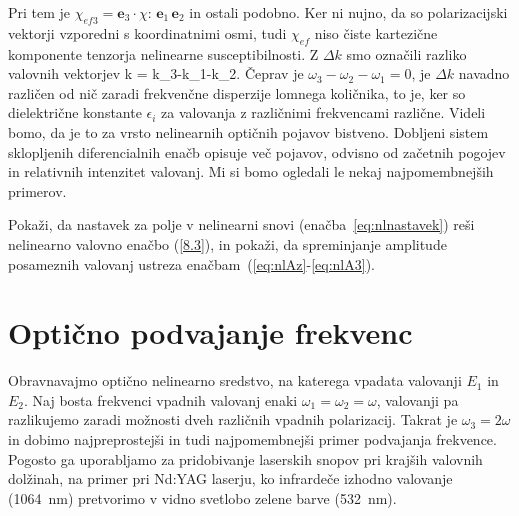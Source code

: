 \documentclass[11pt,fleqn]{book} %
\begin{document}
Pri tem je $\chi_{ef3}=\mathbf{e}_{3}\cdot\chi:\,\mathbf{e}_{1}\,\mathbf{e}_{2}$ in ostali podobno.
Ker ni nujno, da so polarizacijski vektorji vzporedni s koordinatnimi osmi, tudi $\chi_{ef}$ 
niso čiste kartezične komponente tenzorja nelinearne susceptibilnosti. 
Z $\Delta k$ smo označili razliko valovnih vektorjev
\beq
\Delta k = k_{3}-k_{1}-k_{2}.
\eeq
Čeprav je $\omega_{3}-\omega_{2}-\omega_{1}=0$, je $\Delta k$ navadno različen od nič zaradi 
frekvenčne disperzije lomnega količnika, to je, ker so dielektrične konstante $\epsilon_{i}$
za valovanja z različnimi frekvencami različne. Videli bomo, da je to za vrsto nelinearnih optičnih pojavov
bistveno. Dobljeni sistem sklopljenih diferencialnih enačb opisuje več pojavov, 
odvisno od začetnih pogojev in relativnih intenzitet valovanj. Mi si bomo ogledali le nekaj
najpomembnejših primerov.
\begin{definition}
Pokaži, da nastavek za polje v nelinearni snovi (enačba~\ref{eq:nlnastavek}) reši nelinearno
valovno enačbo (\ref{8.3}), in pokaži, da spreminjanje amplitude posameznih valovanj 
ustreza enačbam~(\ref{eq:nlAz}-\ref{eq:nlA3}).
\end{definition}

\section{Optično podvajanje frekvenc}
Obravnavajmo optično nelinearno sredstvo, na katerega vpadata valovanji $E_1$ in $E_2$.
Naj bosta frekvenci vpadnih valovanj enaki $\omega_{1}=\omega_{2}=\omega$, valovanji
pa razlikujemo zaradi možnosti dveh različnih vpadnih polarizacij. Takrat je $\omega_{3}=2\omega$
in dobimo najpreprostejši in tudi najpomembnejši primer podvajanja frekvence. 
Pogosto ga uporabljamo za pridobivanje laserskih snopov pri krajših valovnih dolžinah, na primer
pri Nd:YAG laserju, ko infrardeče izhodno valovanje (1064~nm) 
pretvorimo v vidno svetlobo zelene barve (532~nm). 
\end{document}
